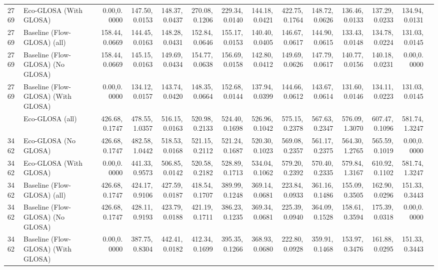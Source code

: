 \begin{table}[ht]
{\begin{tabular}{llrrrrrrrrrrrr}
        2769 & Eco-GLOSA (With GLOSA)             & 0.00,0.0000   & 147.50,0.0153 & 148.37,0.0437 & 270.08,0.1206 & 229.34,0.0140 & 144.18,0.0421 & 422.75,0.1764 & 148.72,0.0626 & 136.46,0.0133 & 137.29,0.0233 & 134.94,0.0131 \\
        2769 & Baseline (Flow-GLOSA) (all)        & 158.44,0.0669 & 144.45,0.0163 & 148.28,0.0431 & 152.84,0.0646 & 155.17,0.0153 & 140.40,0.0405 & 146.67,0.0617 & 144.90,0.0615 & 133.43,0.0148 & 134.78,0.0224 & 131.03,0.0145 \\
        2769 & Baseline (Flow-GLOSA) (No GLOSA)   & 158.44,0.0669 & 145.15,0.0163 & 149.69,0.0434 & 154.77,0.0638 & 156.69,0.0158 & 142.80,0.0412 & 149.69,0.0626 & 147.79,0.0617 & 140.77,0.0156 & 140.18,0.0231 & 0.00,0.0000   \\
        2769 & Baseline (Flow-GLOSA) (With GLOSA) & 0.00,0.0000   & 134.12,0.0157 & 143.74,0.0420 & 148.35,0.0664 & 152.68,0.0144 & 137.94,0.0399 & 144.66,0.0612 & 143.67,0.0614 & 131.60,0.0146 & 134.11,0.0223 & 131.03,0.0145 \\
        \addlinespace
        3462 & Eco-GLOSA (all)                    & 426.68,0.1747 & 478.55,1.0357 & 516.15,0.0163 & 520.98,0.2133 & 524.40,0.1698 & 526.96,0.1042 & 575.15,0.2378 & 567.63,0.2347 & 576.09,1.3070 & 607.47,0.1096 & 581.74,1.3247 \\
        3462 & Eco-GLOSA (No GLOSA)               & 426.68,0.1747 & 482.58,1.0442 & 518.53,0.0168 & 521.15,0.2112 & 521.24,0.1687 & 520.30,0.1023 & 569.08,0.2357 & 561.17,0.2375 & 564.30,1.2765 & 565.59,0.1019 & 0.00,0.0000   \\
        3462 & Eco-GLOSA (With GLOSA)             & 0.00,0.0000   & 441.33,0.9573 & 506.85,0.0142 & 520.58,0.2182 & 528.89,0.1713 & 534.04,0.1062 & 579.20,0.2392 & 570.40,0.2335 & 579.84,1.3167 & 610.92,0.1102 & 581.74,1.3247 \\
        3462 & Baseline (Flow-GLOSA) (all)        & 426.68,0.1747 & 424.17,0.9106 & 427.59,0.0187 & 418.54,0.1707 & 389.99,0.1248 & 369.14,0.0681 & 223.84,0.0933 & 361.16,0.1486 & 155.09,0.3505 & 162.90,0.0296 & 151.33,0.3443 \\
        3462 & Baseline (Flow-GLOSA) (No GLOSA)   & 426.68,0.1747 & 428.11,0.9193 & 423.79,0.0188 & 421.19,0.1711 & 386.23,0.1235 & 369.34,0.0681 & 225.39,0.0940 & 364.09,0.1528 & 158.61,0.3594 & 175.39,0.0318 & 0.00,0.0000   \\
        3462 & Baseline (Flow-GLOSA) (With GLOSA) & 0.00,0.0000   & 387.75,0.8304 & 442.41,0.0182 & 412.34,0.1699 & 395.35,0.1266 & 368.93,0.0680 & 222.80,0.0928 & 359.91,0.1468 & 153.97,0.3476 & 161.88,0.0295 & 151.33,0.3443 \\
        \bottomrule
      \end{tabular}
    }
\end{table}

